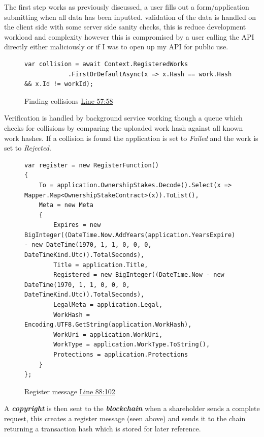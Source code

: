 \documentclass[12pt]{article}
\newcommand{\keyword}[1]{\textbf{\textit{#1}}}
\begin{document}
The first step works as previously discussed, a user fills out a form/application submitting when all data has been inputted. validation of the data is handled on the client side with some server side sanity checks, this is reduce development workload and complexity however this is compromised by a user calling the API directly either maliciously or if I was to open up my API for public use.

\begin{figure}[H]
\caption{Finding collisions \href{https://github.com/MrHarrisonBarker/CRPL/blob/main/CRPL.Web/Services/WorksVerificationService.cs}{Line 57:58}}
\centering
\begin{lstlisting}[language=CSharp]
var collision = await Context.RegisteredWorks
           	.FirstOrDefaultAsync(x => x.Hash == work.Hash && x.Id != workId);
\end{lstlisting}
\end{figure}

Verification is handled by background service working though a queue which checks for collisions by comparing the uploaded work hash against all known work hashes. If a collision is found the application is set to \textit{Failed} and the work is set to \textit{Rejected}.

\begin{figure}[H]
\caption{Register message \href{https://github.com/MrHarrisonBarker/CRPL/blob/main/CRPL.Web/Services/RegistrationService.cs}{Line 88:102}}
\centering
\begin{lstlisting}[language=CSharp]
var register = new RegisterFunction()
{
	To = application.OwnershipStakes.Decode().Select(x => Mapper.Map<OwnershipStakeContract>(x)).ToList(),
	Meta = new Meta
	{
		Expires = new BigInteger((DateTime.Now.AddYears(application.YearsExpire) - new DateTime(1970, 1, 1, 0, 0, 0, DateTimeKind.Utc)).TotalSeconds),
		Title = application.Title,
		Registered = new BigInteger((DateTime.Now - new DateTime(1970, 1, 1, 0, 0, 0, DateTimeKind.Utc)).TotalSeconds),
		LegalMeta = application.Legal,
		WorkHash = Encoding.UTF8.GetString(application.WorkHash),
		WorkUri = application.WorkUri,
		WorkType = application.WorkType.ToString(),
		Protections = application.Protections
	}
};
\end{lstlisting}
\end{figure}

A \keyword{copyright} is then sent to the \keyword{blockchain} when a shareholder sends a complete request, this creates a register message (seen above) and sends it to the chain returning a transaction hash which is stored for later reference.
\end{document}
